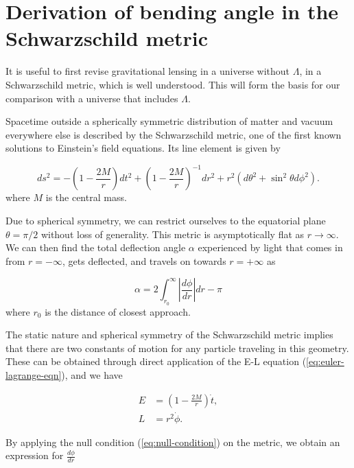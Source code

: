\section{Derivation of bending angle in the Schwarzschild metric}

It is useful to first revise gravitational lensing in a universe without $\Lambda$, in a Schwarzschild metric, which is well understood. This will form the basis for our comparison with a universe that includes $\Lambda$. 

Spacetime outside a spherically symmetric distribution of matter and vacuum everywhere else is described by the Schwarzschild metric, one of the first known solutions to Einstein's field equations. Its line element is given by

\begin{equation}
  ds^2 = -\left ( 1- \frac{2M}{r} \right ) dt^2 + \left ( 1 - \frac{2M}{r}\right )^{-1} dr^2 + r^2(d\theta^2 + \sin^2\theta d \phi^2).
  \label{eq:schwarzschild-metric}
\end{equation}
where $M$ is the central mass. 

Due to spherical symmetry, we can restrict ourselves to the equatorial plane $\theta = \pi/2$ without loss of generality. This metric is asymptotically flat as $r \rightarrow \infty$. We can then find the total deflection angle $\alpha$ experienced by light that comes in from $r=-\infty$, gets deflected, and travels on towards $r=+\infty$ as 

\begin{equation}
  \alpha = 2 \int_{r_0}^{\infty} \left |  \frac{d\phi}{dr} \right | dr - \pi
\end{equation}
where $r_0$ is the distance of closest approach. 

The static nature and spherical symmetry of the Schwarzschild metric implies that there are two constants of motion for any particle traveling in this geometry. These can be obtained through direct application of the E-L equation (\autoref{eq:euler-lagrange-eqn}), and we have

\begin{subequations}
  \begin{align}
    E &= \left ( 1 - \frac{2M}{r} \right ) \dot{t},\\
    L &= r^2\dot{\phi}.
  \end{align}
  \label{eq:schwarzschild-constants}
\end{subequations}

By applying the null condition (\autoref{eq:null-condition}) on the metric, we obtain an expression for $\frac{d\phi}{dr}$

